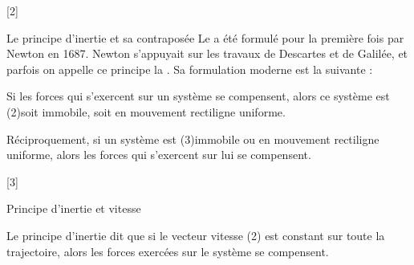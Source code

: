 [2]



\begin{doc}{Le principe d'inertie et sa contraposée}
  \chevron Le  a été formulé pour la première fois par Newton en 1687.
  Newton s'appuyait sur les travaux de Descartes et de Galilée, et parfois on appelle ce principe la .
  Sa formulation moderne est la suivante :
  
  \begin{importants}
    Si les forces qui s'exercent sur un système se compensent, alors ce système est \texteTrou(2){soit immobile, soit en mouvement rectiligne uniforme.}
  \end{importants}
  
  \begin{importants}
    Réciproquement, si un système est
    \texteTrou(3){immobile ou en mouvement rectiligne uniforme, alors les forces qui s'exercent sur lui se compensent.}
  \end{importants}
\end{doc}


[3]

\begin{doc}{Principe d'inertie et vitesse}
  \begin{importants}
    Le principe d'inertie dit que si le vecteur vitesse
    \texteTrou(2){
      est constant sur toute la trajectoire, alors les forces exercées sur le système se compensent.
    }
  \end{importants}
\end{doc}